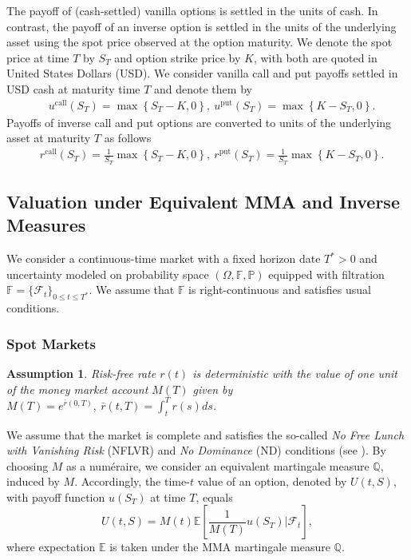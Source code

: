 \documentclass[11pt,a4paper] {article}
\newtheorem{assumption}{Assumption}[section]
\begin{document}
The payoff of (cash-settled) vanilla options is settled in the units of cash. In contrast, the payoff of an inverse option is settled in the units of the underlying asset using the spot price observed at the option maturity. We denote the spot price at time $T$ by $S_T$ and option strike price by $K$, with both are quoted in United States Dollars (USD). We consider vanilla call and put payoffs settled in USD cash at maturity time $T$ and denote them by
\begin{equation}\label{eq:call_put_vanilla}
\begin{split}
& u^{\text{call}}(S_{T}) = \max\left\{ S_{T} -K, 0\right\}, \  u^{\text{put}}(S_{T}) = \max\left\{ K-S_{T}, 0\right\}.
\end{split}
\end{equation}
Payoffs of inverse call and put options are converted to units of the underlying asset at maturity $T$ as follows
\begin{equation}\label{eq:call_put_inverse}
\begin{split}
& r^{\text{call}}(S_{T}) =  \frac{1}{S_{T}}\max\left\{ S_{T} -K, 0\right\} , \  r^{\text{put}}(S_{T}) =  \frac{1}{S_{T}}\max\left\{ K-S_{T}, 0\right\}.
\end{split}
\end{equation}


\subsection{Valuation under Equivalent MMA and Inverse Measures}

We consider a continuous-time market with a fixed horizon date $T^{*}>0$ and uncertainty modeled on probability space $(\Omega, \mathbb{F}, \mathbb{P})$ equipped with filtration $\mathbb{F}=\{\mathcal{F}_t\}_{0\le t\le T^*}$. We assume that $\mathbb{F}$  is right-continuous and satisfies usual conditions. 


\subsubsection{Spot Markets}

\begin{assumption}\label{a:r} Risk-free rate $r(t)$ is deterministic with the value of one unit of the money market account $M(T)$ given by $M(T)=e^{\bar{r}(0, T)}, \ \bar{r}(t, T)=\int^{T}_{t}r(s)ds$.
\end{assumption}
We assume that the market is complete and satisfies the so-called {\it No Free Lunch with Vanishing Risk} (NFLVR) and {\it No Dominance} (ND) conditions (see \cite{JarrowLarsson2012}). By choosing $M$ as a num\'eraire, we consider an equivalent martingale measure $\mathbb{Q}$, induced by $M$.  
Accordingly, the time-$t$ value of an option, denoted by $U(t,S)$, with payoff function $u(S_T)$ at time $T$, equals
\begin{equation}\label{eq:umma}
U(t,S)=M(t)\mathbb{E}\left[\frac{1}{M(T)}\left.u(S_T)\right|\mathcal{F}_{t}\right],
\end{equation}
where expectation $\mathbb{E}$ is taken under the MMA martingale measure $\mathbb{Q}$.
\end{document}
